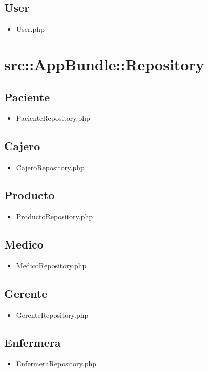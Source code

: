 		\subsection{User}
		\begin{itemize}
			\item User.php
		\end{itemize}
		
\section{src::AppBundle::Repository}
	
	\subsection{Paciente}
		\begin{itemize}
		\item PacienteRepository.php
		\end{itemize}
		\subsection{Cajero}
		\begin{itemize}
			\item CajeroRepository.php
		\end{itemize}
		\subsection{Producto}
		\begin{itemize}
			\item ProductoRepository.php
		\end{itemize}
		\subsection{Medico}
		\begin{itemize}
			\item MedicoRepository.php
		\end{itemize}
		\subsection{Gerente}
		\begin{itemize}
			\item GerenteRepository.php
		\end{itemize}
		\subsection{Enfermera}
		\begin{itemize}
			\item EnfermeraRepository.php
		\end{itemize}
